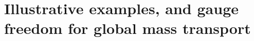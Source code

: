 \documentclass[oneside,11pt]{article}
\theoremstyle{remark}
\begin{document}
 


\appendix

\section{Illustrative examples, and gauge freedom for global mass transport}\label{appendix:IntroExample}
\end{document}
